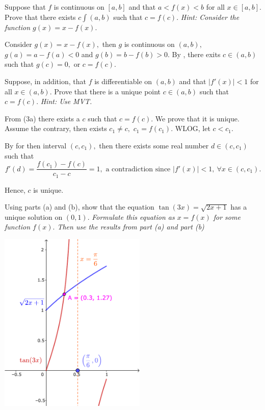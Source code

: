 \documentclass{article}
\begin{document}
\begin{problem*}[3a]
    Suppose that $f$ is continuous on $[a,b]$ and that $a < f(x) < b$ for all $x \in [a,b].$
    Prove that there exists $c \int (a, b)$ such that $c = f(c).$ 
    \textit{Hint: Consider the function $g(x) = x - f (x).$}
\end{problem*}

\begin{soln}
    Consider $g(x) = x - f(x),$ then $g$ is continuous on $(a,b),$ $g(a) = a - f(a) < 0$ and $g(b) = b - f(b) > 0.$
    By , there exits $c \in (a,b)$ such that $g(c) = 0,$ or $\boxed{c = f(c).}$
\end{soln}

\bigbreak

\begin{problem*}[3b]
    Suppose, in addition, that $f$ is differentiable on $(a,b)$ and that $|f'(x)| < 1$ for all $x \in (a,b).$
    Prove that there is a unique point $c \in (a, b)$ such that $c = f(c).$
    \textit{Hint: Use MVT.}
\end{problem*}

\begin{soln}
    From (3a) there exists a $c$ such that $c = f(c).$ We prove that it is unique.
    Assume the contrary, then exists $c_1 \ne c,$ $c_1 = f(c_1).$ WLOG, let $c < c_1.$

    By  for then interval $(c, c_1),$ then there exists some real number $d \in (c,c_1)$ such that 
    \[
        f'(d) = \frac{f(c_1) - f(c)}{c_1 - c} = 1, \text{\ a contradiction since\ } |f'(x)| < 1,\ \forall x \in (c, c_1).
    \]
    
    Hence, $c$ is unique.
\end{soln}

\newpage

\begin{problem*}[3c]
    Using parts (a) and (b), show that the equation $\tan(3x) = \sqrt{2x + 1}$ has a unique solution on $(0, 1).$
    \textit{Formulate this equation as $x = f(x)$ for some function $f(x).$ Then use the results from part (a) and part (b)}
\end{problem*}

\begin{center}
    \includegraphics[width=7cm]{./svg/pdf/derivative-2-3c.pdf}
\end{center}
\end{document}
